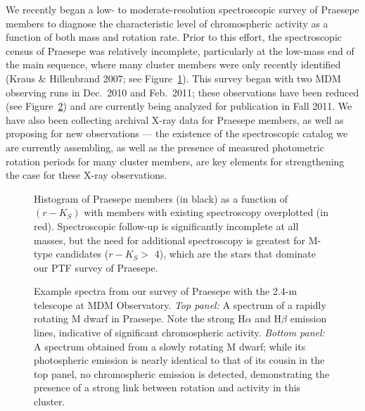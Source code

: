 We recently began a low- to moderate-resolution spectroscopic survey of Praesepe members to diagnose the characteristic level of chromospheric activity as a function of both mass and rotation rate.  Prior to this effort, the spectroscopic census of Praesepe was relatively incomplete, particularly at the low-mass end of the main sequence, where many cluster members were only recently identified (Kraus \& Hillenbrand 2007; see Figure~\ref{need_spec}). This survey began with two MDM observing runs in Dec.\ 2010 and Feb.\ 2011; these observations have been reduced (see Figure~\ref{sample}) and are currently being analyzed for publication in Fall 2011.  We have also been collecting archival X-ray data for Praesepe members, as well as proposing for new observations --- the existence of the spectroscopic catalog we are currently assembling, as well as the presence of measured photometric rotation periods for many cluster members, are key elements for strengthening the case for these X-ray observations. 

\begin{figure}[h!]
\vspace{-.5cm}
\caption{Histogram of Praesepe members (in black) as a function of $(r - K_S)$ with members with existing spectroscopy overplotted (in red).  Spectroscopic follow-up is significantly incomplete at all masses, but the need for additional spectroscopy is greatest for M-type candidates ($r-K_S >$ 4),  which are the stars that dominate our PTF survey of Praesepe.}\label{need_spec}
\end{figure}

\begin{figure}[!ht]
\vspace{-0.5cm}
\caption{Example spectra from our survey of Praesepe with the 2.4-m telescope at MDM Observatory.  {\it Top panel:} A spectrum of a rapidly rotating M dwarf in Praesepe. Note the strong H$\alpha$ and H$\beta$ emission lines, indicative of significant chromospheric activity.  {\it Bottom panel:} A spectrum obtained from a slowly rotating M dwarf; while its photospheric emission is nearly identical to that of its cousin in the top panel, no chromospheric emission is detected, demonstrating the presence of a strong link between rotation and activity in this cluster.}\label{sample}
\end{figure}


